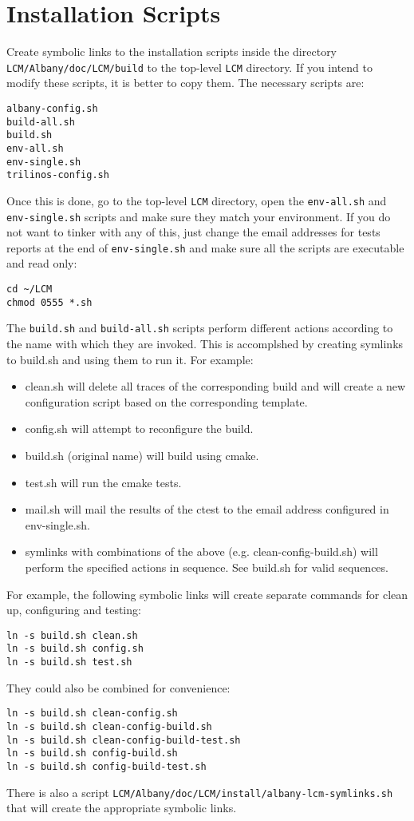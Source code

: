 \documentclass{article}
\begin{document}
\section{Installation Scripts}
Create symbolic links to the installation scripts inside the directory
\verb+LCM/Albany/doc/LCM/build+ to the top-level \verb+LCM+
directory. If you intend to modify these scripts, it is better to copy
them. The necessary scripts are:
\begin{verbatim}
albany-config.sh
build-all.sh
build.sh
env-all.sh
env-single.sh
trilinos-config.sh
\end{verbatim}

Once this is done, go to the top-level \verb+LCM+ directory, open the
\verb+env-all.sh+ and \verb+env-single.sh+ scripts and make sure they
match your environment. If you do not want to tinker with any of this,
just change the email addresses for tests reports at the end of
\verb+env-single.sh+ and make sure all the scripts are executable and
read only:
\begin{verbatim}
cd ~/LCM
chmod 0555 *.sh
\end{verbatim}

The \verb+build.sh+ and \verb+build-all.sh+ scripts perform different
actions according to the name with which they are invoked. This is
accomplshed by creating symlinks to build.sh and using them to run
it. For example:
\begin{itemize}
\item clean.sh will delete all traces of the corresponding build and
  will create a new configuration script based on the corresponding
  template.

\item config.sh will attempt to reconfigure the build.

\item build.sh (original name) will build using cmake.

\item test.sh will run the cmake tests.

\item mail.sh will mail the results of the ctest to the email address
  configured in env-single.sh.

\item symlinks with combinations of the above
  (e.g. clean-config-build.sh) will perform the specified actions in
  sequence. See build.sh for valid sequences.
\end{itemize}
For example, the following symbolic links will create separate
commands for clean up, configuring and testing:
\begin{verbatim}
ln -s build.sh clean.sh
ln -s build.sh config.sh
ln -s build.sh test.sh
\end{verbatim}
They could also be combined for convenience:
\begin{verbatim}
ln -s build.sh clean-config.sh
ln -s build.sh clean-config-build.sh
ln -s build.sh clean-config-build-test.sh
ln -s build.sh config-build.sh
ln -s build.sh config-build-test.sh
\end{verbatim}
There is also a script
\verb+LCM/Albany/doc/LCM/install/albany-lcm-symlinks.sh+
that will create the appropriate symbolic links. 
\end{document}
